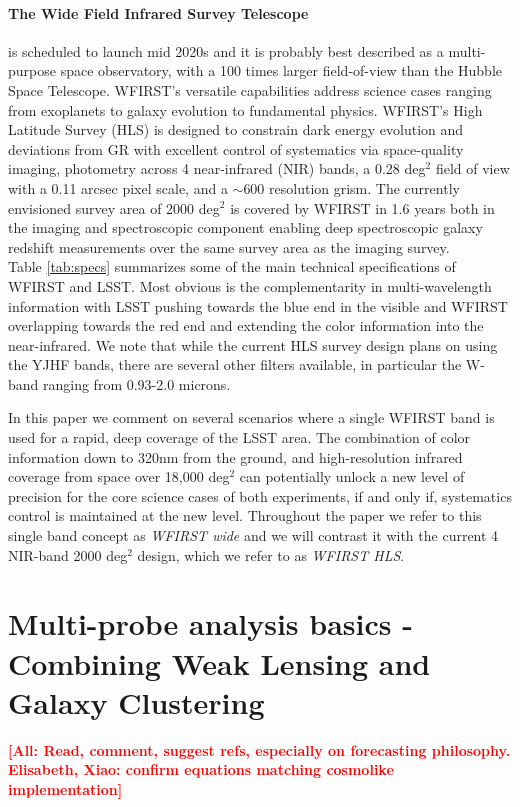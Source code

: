 \documentclass[fleqn,usenatbib,useAMS]{mnras}
\newcommand{\todo}[1]{\textcolor{red}{\textbf{[#1]}}}
\begin{document}
\paragraph*{The Wide Field Infrared Survey Telescope} is scheduled to launch mid 2020s and it is probably best described as a multi-purpose space observatory, with a 100 times larger field-of-view than the Hubble Space Telescope. WFIRST's versatile capabilities address science cases ranging from exoplanets to galaxy evolution to fundamental physics. WFIRST's High Latitude Survey (HLS) is designed to constrain dark energy evolution and deviations from GR with excellent control of systematics via space-quality imaging, photometry across 4 near-infrared (NIR) bands, a 0.28 deg$^2$ field of view with a 0.11 arcsec pixel scale, and a $\sim$600 resolution grism. The currently envisioned survey area of 2000 deg$^2$ is covered by WFIRST in 1.6 years both in the imaging and spectroscopic component enabling deep spectroscopic galaxy redshift measurements over the same survey area as the imaging survey. \\ 

Table \ref{tab:specs} summarizes some of the main technical specifications of WFIRST and LSST. Most obvious is the complementarity in multi-wavelength information with LSST pushing towards the blue end in the visible and WFIRST overlapping towards the red end and extending the color information into the near-infrared. We note that while the current HLS survey design plans on using the YJHF bands, there are several other filters available, in particular the W-band ranging from 0.93-2.0 microns. 

In this paper we comment on several scenarios where a single WFIRST band is used for a rapid, deep coverage of the LSST area. The combination of color information down to 320nm from the ground, and high-resolution infrared coverage from space over 18,000 deg$^2$ can potentially unlock a new level of precision for the core science cases of both experiments, if and only if, systematics control is maintained at the new level. Throughout the paper we refer to this single band concept as \textit{WFIRST wide} and we will contrast it with the current 4 NIR-band 2000 deg$^2$ design, which we refer to as \textit{WFIRST HLS}. 

\section{Multi-probe analysis basics - Combining Weak Lensing and Galaxy Clustering}
\label{sec:basics}
\todo{All: Read, comment, suggest refs, especially on forecasting philosophy.\\ Elisabeth, Xiao: confirm equations matching cosmolike implementation}
\end{document}
